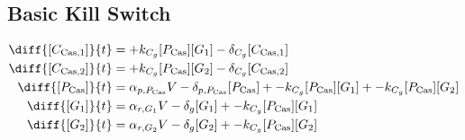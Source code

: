 \subsection{Basic Kill Switch}
\label{s:Basic_kill_switch}

\begin{align}
\diff{\conc{\cplx{\cas}{1}}}{t} & =  + \gRnaBind{}\conc{\proSp{\cas{}}}\conc{\gRna{1}} - \casCompDegradeRate{}\conc{\cplx{\cas}{1}}\\ 
\diff{\conc{\cplx{\cas}{2}}}{t} & =  + \gRnaBind{}\conc{\proSp{\cas{}}}\conc{\gRna{2}} - \casCompDegradeRate{}\conc{\cplx{\cas}{2}}\\ 
\diff{\conc{\proSp{\cas{}}}}{t} & =  \txtlRate{\proSp{\cas{}}}\vectorGen{} - \proDegradeRate{\proSp{\cas{}}}\conc{\proSp{\cas{}}} + - \gRnaBind{}\conc{\proSp{\cas{}}}\conc{\gRna{1}} + - \gRnaBind{}\conc{\proSp{\cas{}}}\conc{\gRna{2}}\\ 
\diff{\conc{\gRna{1}}}{t} & =  \txRate{\gRna{1}}\vectorGen{} - \rnaDegradeRate{}\conc{\gRna{1}} + - \gRnaBind{}\conc{\proSp{\cas{}}}\conc{\gRna{1}}\\ 
\diff{\conc{\gRna{2}}}{t} & =  \txRate{\gRna{2}}\vectorGen{} - \rnaDegradeRate{}\conc{\gRna{2}} + - \gRnaBind{}\conc{\proSp{\cas{}}}\conc{\gRna{2}}
\end{align}

